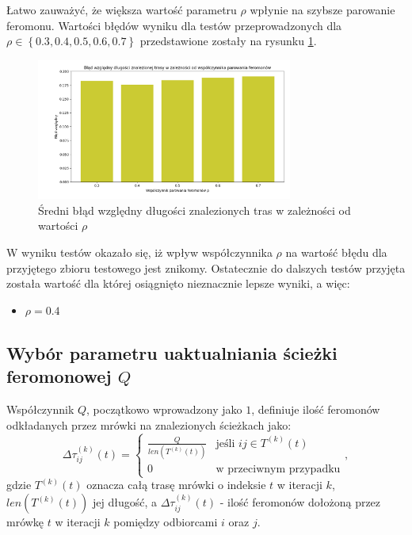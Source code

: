 \documentclass[10pt]{article}
\begin{document}
Łatwo zauważyć, że większa wartość parametru $\rho$ wpłynie na szybsze parowanie feromonu. Wartości błędów wyniku dla testów przeprowadzonych dla $\rho \in \left\{ 0.3, 0.4, 0.5, 0.6, 0.7 \right\}$ przedstawione zostały na rysunku \ref{fig:rho}.

\begin{figure}[H]
    \centering
    \includegraphics[width=0.75\textwidth]{rho.png}
    \caption{Średni błąd względny długości znalezionych tras w zależności od wartości $\rho$}
    \label{fig:rho}
\end{figure}

W wyniku testów okazało się, iż wpływ współczynnika $\rho$ na wartość błędu dla przyjętego zbioru testowego jest znikomy. Ostatecznie do dalszych testów przyjęta została wartość dla której osiągnięto nieznacznie lepsze wyniki, a więc:
\begin{itemize}
    \item $\rho = 0.4$
\end{itemize}

\subsection{Wybór parametru uaktualniania ścieżki feromonowej $Q$}
Współczynnik $Q$, początkowo wprowadzony jako $1$, definiuje ilość feromonów odkładanych przez mrówki na znalezionych ścieżkach jako:
\begin{equation*}
    \Delta\tau_{ij}^{(k)}(t) =
    \begin{cases}
      \frac{Q}{len\left(T^{(k)}(t)\right)} & \text{jeśli $ij \in T^{(k)}(t)$}\\
      0 & \text{w przeciwnym przypadku}
    \end{cases},
\end{equation*}
gdzie $T^{(k)}(t)$ oznacza całą trasę mrówki o indeksie $t$ w iteracji $k$, $len\left(T^{(k)}(t)\right)$ jej długość, a $\Delta\tau_{ij}^{(k)}(t)$ - ilość feromonów dołożoną przez mrówkę $t$ w iteracji $k$ pomiędzy odbiorcami $i$ oraz $j$.
\end{document}
